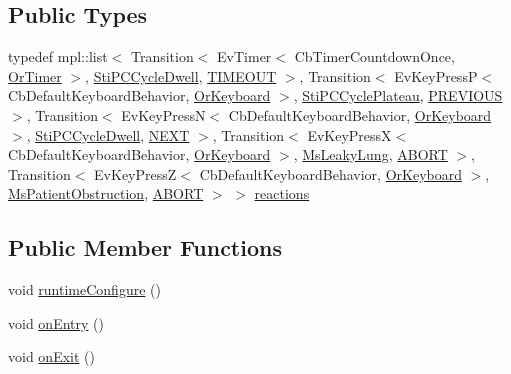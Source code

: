 \subsection*{Public Types}
\begin{DoxyCompactItemize}
\item 
typedef mpl\+::list$<$ Transition$<$ Ev\+Timer$<$ Cb\+Timer\+Countdown\+Once, \hyperlink{classsm__respira__1_1_1OrTimer}{Or\+Timer} $>$, \hyperlink{structsm__respira__1_1_1pc__cycle__inner__states_1_1StiPCCycleDwell}{Sti\+P\+C\+Cycle\+Dwell}, \hyperlink{structsm__respira__1_1_1pc__cycle__inner__states_1_1StiPCCycleExpire_1_1TIMEOUT}{T\+I\+M\+E\+O\+UT} $>$, Transition$<$ Ev\+Key\+PressP$<$ Cb\+Default\+Keyboard\+Behavior, \hyperlink{classsm__respira__1_1_1OrKeyboard}{Or\+Keyboard} $>$, \hyperlink{structsm__respira__1_1_1pc__cycle__inner__states_1_1StiPCCyclePlateau}{Sti\+P\+C\+Cycle\+Plateau}, \hyperlink{structsm__respira__1_1_1pc__cycle__inner__states_1_1StiPCCycleExpire_1_1PREVIOUS}{P\+R\+E\+V\+I\+O\+US} $>$, Transition$<$ Ev\+Key\+PressN$<$ Cb\+Default\+Keyboard\+Behavior, \hyperlink{classsm__respira__1_1_1OrKeyboard}{Or\+Keyboard} $>$, \hyperlink{structsm__respira__1_1_1pc__cycle__inner__states_1_1StiPCCycleDwell}{Sti\+P\+C\+Cycle\+Dwell}, \hyperlink{structsm__respira__1_1_1pc__cycle__inner__states_1_1StiPCCycleExpire_1_1NEXT}{N\+E\+XT} $>$, Transition$<$ Ev\+Key\+PressX$<$ Cb\+Default\+Keyboard\+Behavior, \hyperlink{classsm__respira__1_1_1OrKeyboard}{Or\+Keyboard} $>$, \hyperlink{classsm__respira__1_1_1MsLeakyLung}{Ms\+Leaky\+Lung}, \hyperlink{classABORT}{A\+B\+O\+RT} $>$, Transition$<$ Ev\+Key\+PressZ$<$ Cb\+Default\+Keyboard\+Behavior, \hyperlink{classsm__respira__1_1_1OrKeyboard}{Or\+Keyboard} $>$, \hyperlink{classsm__respira__1_1_1MsPatientObstruction}{Ms\+Patient\+Obstruction}, \hyperlink{classABORT}{A\+B\+O\+RT} $>$ $>$ \hyperlink{structsm__respira__1_1_1pc__cycle__inner__states_1_1StiPCCycleExpire_ae08aad9407ec76716ef92383f184df67}{reactions}
\end{DoxyCompactItemize}
\subsection*{Public Member Functions}
\begin{DoxyCompactItemize}
\item 
void \hyperlink{structsm__respira__1_1_1pc__cycle__inner__states_1_1StiPCCycleExpire_a6fa2c541841c39b444f25fdd9b96f7b8}{runtime\+Configure} ()
\item 
void \hyperlink{structsm__respira__1_1_1pc__cycle__inner__states_1_1StiPCCycleExpire_ad5ee63b26397bf9c9b7388f01e2113a1}{on\+Entry} ()
\item 
void \hyperlink{structsm__respira__1_1_1pc__cycle__inner__states_1_1StiPCCycleExpire_ac95d0133d5ad8a49fb1a3a25f5eaa6ca}{on\+Exit} ()
\end{DoxyCompactItemize}
